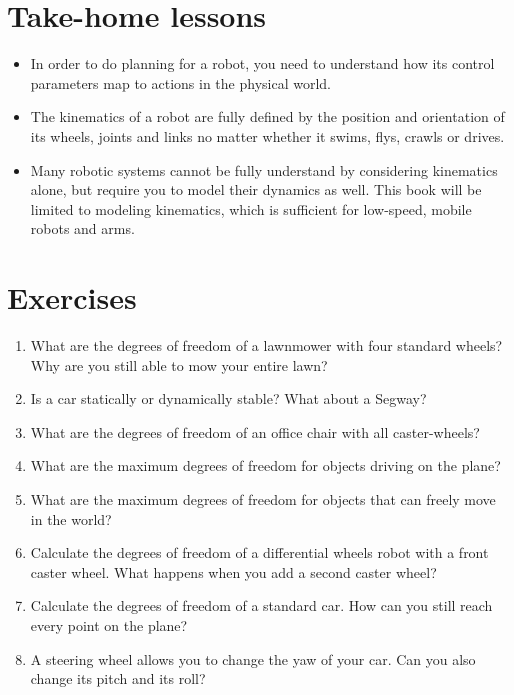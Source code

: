 \section*{Take-home lessons}

\begin{itemize}
\item In order to do planning for a robot, you need to understand how its control parameters map to actions in the physical world.
\item The kinematics of a robot are fully defined by the position and orientation of its wheels, joints and links no matter whether it swims, flys, crawls or drives.
\item Many robotic systems cannot be fully understand by considering kinematics alone, but require you to model their dynamics as well. This book will be limited to modeling kinematics, which is sufficient for low-speed, mobile robots and arms.
\end{itemize} 


\section*{Exercises}\small
\begin{enumerate}
\item What are the degrees of freedom of a lawnmower with four standard wheels? Why are you still able to mow your entire lawn?
\item Is a car statically or dynamically stable? What about a Segway?
\item What are the degrees of freedom of an office chair with all caster-wheels?
\item What are the maximum degrees of freedom for objects driving on the plane?
\item What are the maximum degrees of freedom for objects that can freely move in the world?
\item Calculate the degrees of freedom of a differential wheels robot with a front caster wheel. What happens when you add a second caster wheel?
\item Calculate the degrees of freedom of a standard car. How can you still reach every point on the plane?
\item A steering wheel allows you to change the yaw of your car. Can you also change its pitch and its roll?
\end{enumerate}\normalsize